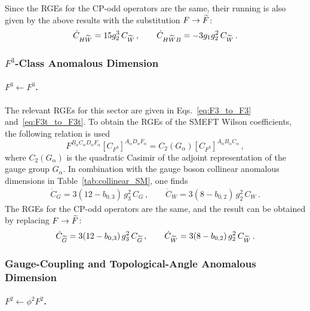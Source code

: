 Since the RGEs for the CP-odd operators are the same, their running is also given by the above results with the substitution $F\to \widetilde{F}$:
\begin{equation}
    \dot{C}_{H\widetilde{W}} = 15 g_2^3\, C_{\widetilde{W}}\,,
    \qquad 
    \dot{C}_{H\widetilde{W}B} = -3g_1 g_2^2\, C_{\widetilde{W}}\,.
\end{equation}

\subsubsection{\texorpdfstring{$F^3$}{F3}-Class Anomalous Dimension}

\paragraph{\texorpdfstring{$F^3\leftarrow F^3$}{F3fromF3}.}

The relevant RGEs for this sector are given in Eqs.~\eqref{eq:F3_to_F3} and~\eqref{eq:F3t_to_F3t}. To obtain the RGEs of the SMEFT Wilson coefficients, the following relation is used
\begin{equation}
    F^{B_\alpha C_\alpha D_\alpha F_\alpha} \left[ C_{F^3}\right]^{A_\alpha D_\alpha F_\alpha} = C_2(G_\alpha) \left[ C_{F^3}\right]^{A_\alpha B_\alpha C_\alpha}\,,
\end{equation}
where $C_2(G_\alpha)$ is the quadratic Casimir of the adjoint representation of the gauge group $G_\alpha$. In combination with the gauge boson collinear anomalous dimensions in Table~\ref{tab:collinear_SM}, one finds
\begin{align}
    \dot C_{G} = 3(12 - b_{0,3})\,g_3^2\, C_{G} \,,\qquad
    \dot C_{W} = 3(8 - b_{0,2})\,g_2^2\, C_{W} \,.
\end{align}
The RGEs for the CP-odd operators are the same, and the result can be obtained by replacing $F\to\widetilde{F}$:
\begin{equation}
    \dot C_{\widetilde{G}} = 3(12 - b_{0,3})\,g_3^2\, C_{\widetilde{G}} \,,\qquad
    \dot C_{\widetilde{W}} = 3(8 - b_{0,2})\,g_2^2\, C_{\widetilde{W}} \,.
\end{equation}

\subsubsection{Gauge-Coupling and Topological-Angle Anomalous Dimension} 

\paragraph{$F^2\leftarrow \phi^2F^2$.}

